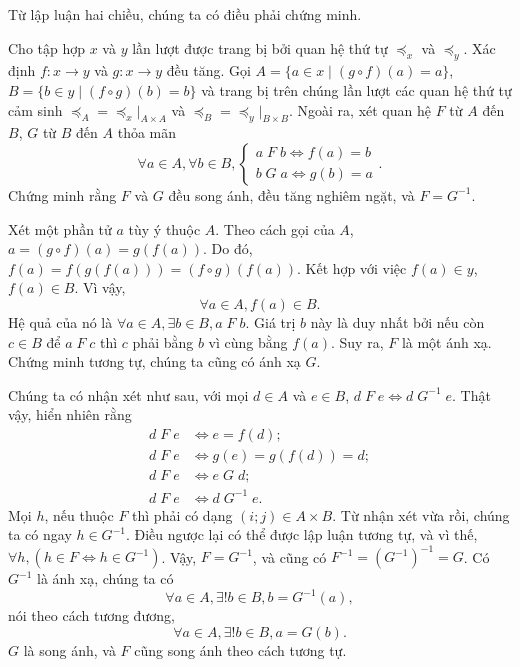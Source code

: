Từ lập luận hai chiều, chúng ta có điều phải chứng minh.

\exercise Cho tập hợp $x$ và $y$ lần lượt được trang bị bởi quan hệ thứ tự $\preccurlyeq_x$ và $\preccurlyeq_y$. Xác định $f: x \to y$ và $g: x \to y$ đều tăng. Gọi $A = \{a \in x \mid (g \circ f)(a) = a\}$, $B = \{b \in y \mid (f \circ g)(b) = b\}$ và trang bị trên chúng lần lượt các quan hệ thứ tự cảm sinh $\preccurlyeq_A = \preccurlyeq_x\!\!|_{A \times A}$ và $\preccurlyeq_B = \preccurlyeq_y\!\!|_{B \times B}$. Ngoài ra, xét quan hệ $F$ từ $A$ đến $B$, $G$ từ $B$ đến $A$ thỏa mãn \begin{equation*}
   \forall a \in A, \forall b \in B, \begin{cases}
      a\;F\;b \iff f(a) = b \\
      b\;G\;a \iff g(b) = a
   \end{cases}.
\end{equation*}
Chứng minh rằng $F$ và $G$ đều song ánh, đều tăng nghiêm ngặt, và $F = G^{-1}$.

\solution

Xét một phần tử $a$ tùy ý thuộc $A$. Theo cách gọi của $A$, $a = (g \circ f)(a) = g(f(a))$. Do đó, $f(a) = f(g(f(a))) = (f \circ g)(f(a))$. Kết hợp với việc $f(a) \in y$, $f(a) \in B$. Vì vậy, \begin{equation*}
   \forall a \in A, f(a) \in B.
\end{equation*}
Hệ quả của nó là $\forall a \in A, \exists b \in B, a\;F\;b$. Giá trị $b$ này là duy nhất bởi nếu còn $c \in B$ để $a\;F\;c$ thì $c$ phải bằng $b$ vì cùng bằng $f(a)$. Suy ra, $F$ là một ánh xạ. Chứng minh tương tự, chúng ta cũng có ánh xạ $G$.

Chúng ta có nhận xét như sau, với mọi $d \in A$ và $e \in B$, $d\;F\;e \iff d\;G^{-1}\;e$. Thật vậy, hiển nhiên rằng \begin{align*}
   d\;F\;e &\iff e = f(d); \\
   d\;F\;e &\iff g(e) = g(f(d)) = d; \\
   d\;F\;e &\iff e\;G\;d; \\
   d\;F\;e &\iff d\;G^{-1}\;e.
\end{align*}
Mọi $h$, nếu thuộc $F$ thì phải có dạng $(i; j) \in A \times B$. Từ nhận xét vừa rồi, chúng ta có ngay $h \in G^{-1}$. Điều ngược lại có thể được lập luận tương tự, và vì thế, $\forall h, (h \in F \iff h \in G^{-1})$. Vậy, $F = G^{-1}$, và cũng có $F^{-1} = \left(G^{-1}\right)^{-1} = G$. Có $G^{-1}$ là ánh xạ, chúng ta có \begin{equation*}
   \forall a \in A, \exists ! b \in B, b = G^{-1}(a),
\end{equation*}
nói theo cách tương đương, 
\begin{equation*}
   \forall a \in A, \exists ! b \in B, a = G(b).
\end{equation*}
$G$ là song ánh, và $F$ cũng song ánh theo cách tương tự.

